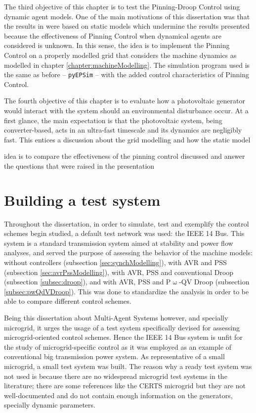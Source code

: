 	The third objective of this chapter is to test the Pinning-Droop Control using dynamic agent models. One of the main motivations of this dissertation was that the results in \cite{Avila2017} were based on static models which undermine the results presented because the effectiveness of Pinning Control when dynamical agents are considered is unknown. In this sense, the idea is to implement the Pinning Control on a properly modelled grid that considers the machine dynamics as modelled in chapter \ref{chapter:machineModelling}. The simulation program used is the same as before -- \texttt{pyEPSim} -- with the added control characteristics of Pinning Control.

	The fourth objective of this chapter is to evaluate how a photovoltaic generator would interact with the system should an environmental disturbance occur. At a first glance, the main expectation is that the photovoltaic system, being converter-based, acts in an ultra-fast timescale and its dynamics are negligibly fast. This entices a discussion about the grid modelling and how the static model 

idea is to compare the effectiveness of the pinning control discussed and answer the questions that were raised in the presentation

\section{Building a test system}\label{sec:testSystemBuilding} %

	Throughout the dissertation, in order to simulate, test and exemplify the control schemes begin studied, a default test network was used: the IEEE 14 Bus. This system is a standard transmission system aimed at stability and power flow analyses, and served the purpose of assessing the behavior of the machine models: without controllers (subsection \ref{sec:synchModelling}), with AVR and PSS (subsection \ref{sec:avrPssModelling}), with AVR, PSS and conventional Droop (subsection \ref{subsec:droop}), and with AVR, PSS and P$\upomega$-Q$\dot{\text{V}}$ Droop (subsection \ref{subsec:pwQdVDroop}). This was done to standardize the analysis in order to be able to compare different control schemes.

	Being this dissertation about Multi-Agent Systems however, and specially microgrid, it urges the usage of a test system specifically devised for assessing microgrid-oriented control schemes. Hence the IEEE 14 Bus system is unfit for the study of microgrid-specific control as it was employed as an example of conventional big transmission power system. As representative of a small microgrid, a small test system was built. The reason why a ready test system was not used is because there are no widespread microgrid test systems in the literature; there are some references like the CERTS microgrid  but they are not well-documented and do not contain enough information on the generators, specially dynamic parameters.

